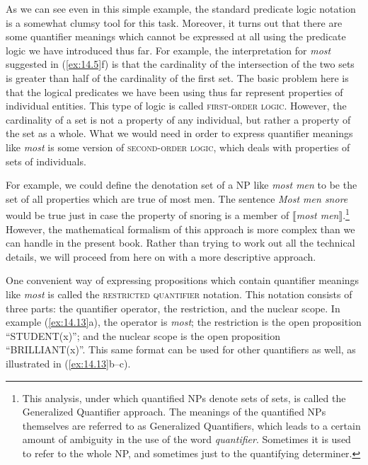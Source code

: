 As we can see even in this simple example, the standard predicate logic notation is a somewhat clumsy tool for this task. Moreover, it turns out that there are some quantifier meanings which cannot be expressed at all using the predicate logic we have introduced thus far. For example, the interpretation for \textit{most} suggested in (\ref{ex:14.5}f) is that the cardinality of the intersection of the two sets is greater than half of the cardinality of the first set. The basic problem here is that the logical predicates we have been using thus far represent properties of individual entities. This type of logic is called \textsc{first-order logic}. However, the cardinality of a set is not a property of any individual, but rather a property of the set as a whole. What we would need in order to express quantifier meanings like \textit{most} is some version of \textsc{second-order logic}, which deals with properties of sets of individuals.



For example, we could define the denotation set of a NP like \textit{most men} to be the set of all properties which are true of most men. The sentence \textit{Most men snore} would be true just in case the property of snoring is a member of $\llbracket$\textit{most men}$\rrbracket$.\footnote{This analysis, under which quantified NPs denote sets of sets, is called the Generalized Quantifier approach. The meanings of the quantified NPs themselves are referred to as Generalized Quantifiers, which leads to a certain amount of ambiguity in the use of the word \textit{quantifier}. Sometimes it is used to refer to the whole NP, and sometimes just to the quantifying determiner.} However, the mathematical formalism of this approach is more complex than we can handle in the present book. Rather than trying to work out all the technical details, we will proceed from here on with a more descriptive approach.



One convenient way of expressing propositions which contain quantifier meanings like \textit{most} is called the \textsc{restricted quantifier} notation. This notation consists of three parts: the quantifier operator, the restriction, and the nuclear scope. In example (\ref{ex:14.13}a), the operator is \textit{most}; the restriction is the open proposition “STUDENT(x)”; and the nuclear scope is the open proposition “BRILLIANT(x)”. This same format can be used for other quantifiers as well, as illustrated in (\ref{ex:14.13}b--c).


